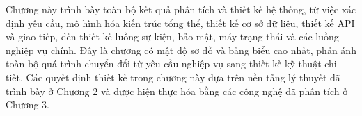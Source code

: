 \documentclass[../DoAn.tex]{subfiles}
\begin{document}
Chương này trình bày toàn bộ kết quả phân tích và thiết kế hệ thống, từ việc xác định yêu
cầu, mô hình hóa kiến trúc tổng thể, thiết kế cơ sở dữ liệu, thiết kế API và giao tiếp,
đến thiết kế luồng sự kiện, bảo mật, máy trạng thái và các luồng nghiệp vụ chính. Đây là
chương có mật độ sơ đồ và bảng biểu cao nhất, phản ánh toàn bộ quá trình chuyển đổi từ yêu
cầu nghiệp vụ sang thiết kế kỹ thuật chi tiết. Các quyết định thiết kế trong chương này
dựa trên nền tảng lý thuyết đã trình bày ở Chương 2 và được hiện
thực hóa bằng các công nghệ đã phân tích ở Chương 3.


\end{document}
